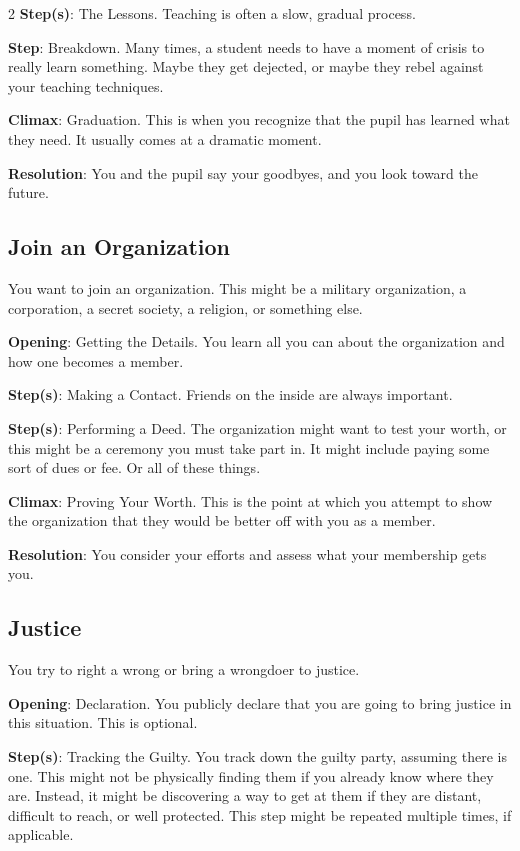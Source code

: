 \begin{multicols}{2}
\textbf{Step(s)}: The Lessons. Teaching is often a slow, gradual process.

\textbf{Step}: Breakdown. Many times, a student needs to have a moment of crisis to really learn something. Maybe they get dejected, or maybe they rebel against your teaching techniques. 

\textbf{Climax}: Graduation. This is when you recognize that the pupil has learned what they need. It usually comes at a dramatic moment. 

\textbf{Resolution}: You and the pupil say your goodbyes, and you look toward the future.

\subsection{Join an Organization}

You want to join an organization. This might be a military organization, a corporation, a secret society, a religion, or something else.

\textbf{Opening}: Getting the Details. You learn all you can about the organization and how one becomes a member.

\textbf{Step(s)}: Making a Contact. Friends on the inside are always important.

\textbf{Step(s)}: Performing a Deed. The organization might want to test your worth, or this might be a ceremony you must take part in. It might include paying some sort of dues or fee. Or all of these things.

\textbf{Climax}: Proving Your Worth. This is the point at which you attempt to show the organization that they would be better off with you as a member.

\textbf{Resolution}: You consider your efforts and assess what your membership gets you.

\subsection{Justice}

You try to right a wrong or bring a wrongdoer to justice. 

\textbf{Opening}: Declaration. You publicly declare that you are going to bring justice in this situation. This is optional.

\textbf{Step(s)}: Tracking the Guilty. You track down the guilty party, assuming there is one. This might not be physically finding them if you already know where they are. Instead, it might be discovering a way to get at them if they are distant, difficult to reach, or well protected. This step might be repeated multiple times, if applicable.


\end{multicols}
